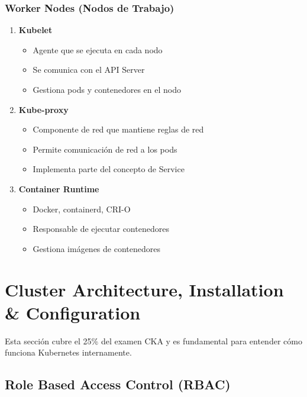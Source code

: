 \documentclass[11pt,a4paper]{article}
\begin{document}
\subsubsection{Worker Nodes (Nodos de Trabajo)}

\begin{enumerate}
    \item \textbf{\textcolor{k8sblue}{Kubelet}}
    \begin{itemize}
        \item Agente que se ejecuta en cada nodo
        \item Se comunica con el API Server
        \item Gestiona pods y contenedores en el nodo
    \end{itemize}
    
    \item \textbf{\textcolor{k8ssuccess}{Kube-proxy}}
    \begin{itemize}
        \item Componente de red que mantiene reglas de red
        \item Permite comunicación de red a los pods
        \item Implementa parte del concepto de Service
    \end{itemize}
    
    \item \textbf{\textcolor{k8swarning}{Container Runtime}}
    \begin{itemize}
        \item Docker, containerd, CRI-O
        \item Responsable de ejecutar contenedores
        \item Gestiona imágenes de contenedores
    \end{itemize}
\end{enumerate}

\newpage

\section{Cluster Architecture, Installation \& Configuration}

\begin{warningbox}
Esta sección cubre el 25\% del examen CKA y es fundamental para entender cómo funciona Kubernetes internamente.
\end{warningbox}

\subsection{Role Based Access Control (RBAC)}
\end{document}
